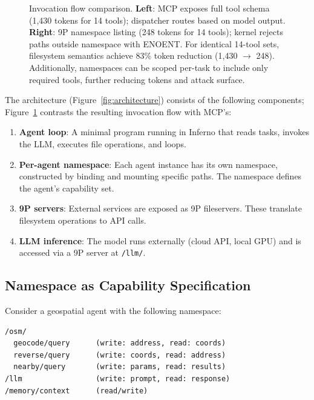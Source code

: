 \documentclass[acmsmall,screen,review]{acmart}
\begin{document}
\begin{figure}[t]
\caption{Invocation flow comparison. \textbf{Left}: MCP exposes full tool schema (1,430 tokens for 14 tools); dispatcher routes based on model output. \textbf{Right}: 9P namespace listing (248 tokens for 14 tools); kernel rejects paths outside namespace with ENOENT. For identical 14-tool sets, filesystem semantics achieve 83\% token reduction (1,430 $\rightarrow$ 248). Additionally, namespaces can be scoped per-task to include only required tools, further reducing tokens and attack surface.}
\label{fig:invocation-comparison}
\end{figure}

The architecture (Figure~\ref{fig:architecture}) consists of the following components; Figure~\ref{fig:invocation-comparison} contrasts the resulting invocation flow with MCP's:

\begin{enumerate}
    \item \textbf{Agent loop}: A minimal program running in Inferno that reads tasks, invokes the LLM, executes file operations, and loops.

    \item \textbf{Per-agent namespace}: Each agent instance has its own namespace, constructed by binding and mounting specific paths. The namespace defines the agent's capability set.

    \item \textbf{9P servers}: External services are exposed as 9P fileservers. These translate filesystem operations to API calls.

    \item \textbf{LLM inference}: The model runs externally (cloud API, local GPU) and is accessed via a 9P server at \texttt{/llm/}.
\end{enumerate}

\subsection{Namespace as Capability Specification}

Consider a geospatial agent with the following namespace:

\begin{lstlisting}[caption={Example agent namespace}]
/osm/
  geocode/query      (write: address, read: coords)
  reverse/query      (write: coords, read: address)
  nearby/query       (write: params, read: results)
/llm                 (write: prompt, read: response)
/memory/context      (read/write)
\end{lstlisting}
\end{document}
